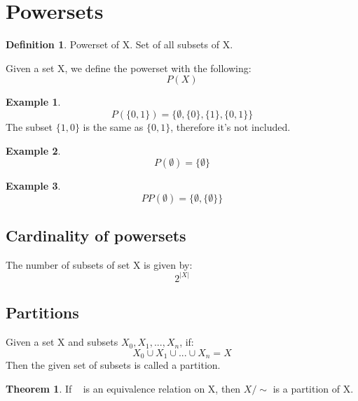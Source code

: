 \documentclass{article}
\theoremstyle{definition}
\newtheorem{df}{Definition}[section]
\newtheorem{ex}{Example}[section]
\newtheorem{thr}{Theorem}
\begin{document}
\section{Powersets}
\begin{df}{Powerset of X.}
	Set of all subsets of X.
\end{df}
Given a set X, we define the powerset with the following:
\[ P(X) \]
\begin{ex}
	\[P(\{0,1\}) = \{\emptyset, \{0\}, \{1\}, \{0, 1\}  \}\]
	The subset $\{1,0\}$ is the same as $\{0,1\}$, therefore it's not included.
\end{ex}
\begin{ex}
	\[P(\emptyset) = \{\emptyset\}\]
\end{ex}
\begin{ex}
	\[PP(\emptyset) = \{\emptyset, \{\emptyset\}\}\]
\end{ex}
\subsection{Cardinality of powersets}
The number of subsets of set X is given by:
\[2^{|X|}\]

\subsection{Partitions}
Given a set X and subsets $X_0, X_1, ..., X_n$, if:
\[X_0 \cup X_1 \cup ... \cup X_n = X\]
Then the given set of subsets is called a partition.

\begin{thr}
If ~ is an equivalence relation on X, then $X/\sim$ is a partition of X.
\end{thr}
\end{document}
